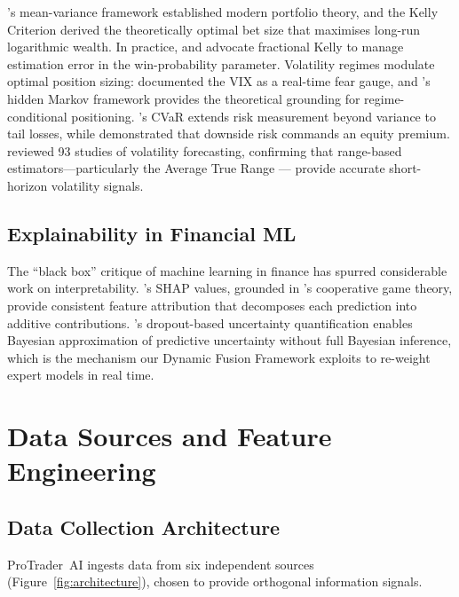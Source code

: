 \documentclass[ASNA,twocolumn]{USG}
\begin{document}
\citet{markowitz1952}'s mean-variance framework established modern portfolio
theory, and the Kelly Criterion \citep{kelly1956} derived the theoretically
optimal bet size that maximises long-run logarithmic wealth. In practice,
\citet{thorp2017} and \citet{maclean2011} advocate fractional Kelly to manage
estimation error in the win-probability parameter. Volatility regimes modulate
optimal position sizing: \citet{whaley2000} documented the VIX as a real-time
fear gauge, and \citet{hamilton1989}'s hidden Markov framework provides the
theoretical grounding for regime-conditional positioning. \citet{rockafellar2000}'s
CVaR extends risk measurement beyond variance to tail losses,
while \citet{ang2006} demonstrated that downside risk commands an equity premium.
\citet{poon2003} reviewed 93 studies of volatility forecasting, confirming that
range-based estimators---particularly the Average True Range \citep{wilder1978}---
provide accurate short-horizon volatility signals.

\subsection{Explainability in Financial ML}

The ``black box'' critique of machine learning in finance has spurred
considerable work on interpretability. \citet{lundberg2017}'s SHAP values,
grounded in \citet{shapley1953}'s cooperative game theory, provide
consistent feature attribution that decomposes each prediction into additive
contributions. \citet{gal2016}'s dropout-based uncertainty quantification
enables Bayesian approximation of predictive uncertainty without full
Bayesian inference, which is the mechanism our Dynamic Fusion Framework
exploits to re-weight expert models in real time.

\section{Data Sources and Feature Engineering}\label{sec:data}

\subsection{Data Collection Architecture}

ProTrader~AI ingests data from six independent sources (Figure~\ref{fig:architecture}),
chosen to provide orthogonal information signals.
\end{document}
